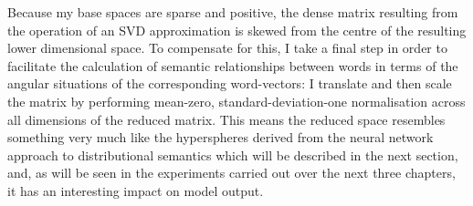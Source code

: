 Because my base spaces are sparse and positive, the dense matrix resulting from the operation of an SVD approximation is skewed from the centre of the resulting lower dimensional space.  To compensate for this, I take a final step in order to facilitate the calculation of semantic relationships between words in terms of the angular situations of the corresponding word-vectors: I translate and then scale the matrix by performing mean-zero, standard-deviation-one normalisation across all dimensions of the reduced matrix.  This means the reduced space resembles something very much like the hyperspheres derived from the neural network approach to distributional semantics which will be described in the next section, and, as will be seen in the experiments carried out over the next three chapters, it has an interesting impact on model output.



